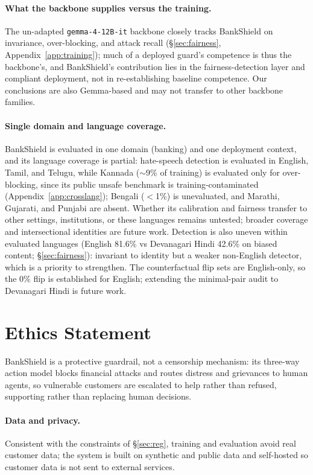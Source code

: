 \documentclass[11pt]{article}
\begin{document}
\paragraph{What the backbone supplies versus the training.} The un-adapted \texttt{gemma-4-12B-it} backbone closely tracks BankShield on invariance, over-blocking, and attack recall (\S\ref{sec:fairness}, Appendix~\ref{app:training}); much of a deployed guard's competence is thus the backbone's, and BankShield's contribution lies in the fairness-detection layer and compliant deployment, not in re-establishing baseline competence. Our conclusions are also Gemma-based and may not transfer to other backbone families.

\paragraph{Single domain and language coverage.} BankShield is evaluated in one domain (banking) and one deployment context, and its language coverage is partial: hate-speech detection is evaluated in English, Tamil, and Telugu, while Kannada ($\sim$9\% of training) is evaluated only for over-blocking, since its public unsafe benchmark is training-contaminated (Appendix~\ref{app:crosslang}); Bengali ($<$1\%) is unevaluated, and Marathi, Gujarati, and Punjabi are absent. Whether its calibration and fairness transfer to other settings, institutions, or these languages remains untested; broader coverage and intersectional identities are future work. Detection is also uneven within evaluated languages (English 81.6\% vs Devanagari Hindi 42.6\% on biased content; \S\ref{sec:fairness}): invariant to identity but a weaker non-English detector, which is a priority to strengthen. The counterfactual flip sets are English-only, so the 0\% flip is established for English; extending the minimal-pair audit to Devanagari Hindi is future work.

\section*{Ethics Statement}

BankShield is a protective guardrail, not a censorship mechanism: its three-way action model blocks financial attacks and routes distress and grievances to human agents, so vulnerable customers are escalated to help rather than refused, supporting rather than replacing human decisions.

\paragraph{Data and privacy.} Consistent with the constraints of \S\ref{sec:reg}, training and evaluation avoid real customer data; the system is built on synthetic and public data and self-hosted so customer data is not sent to external services.
\end{document}

